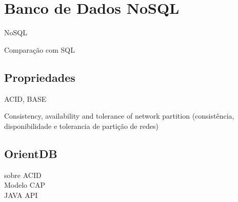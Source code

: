 \chapter{Banco de Dados NoSQL}

\indent NoSQL

\cite{jing12} 


\indent Comparação com SQL \\

\section{Propriedades}

\indent ACID, BASE %

\indent Consistency, availability and tolerance of network partition (consistência, disponibilidade e tolerancia de partição de redes) %

\section{OrientDB}


\indent sobre ACID \\

\indent Modelo CAP \\


\indent JAVA API \\
